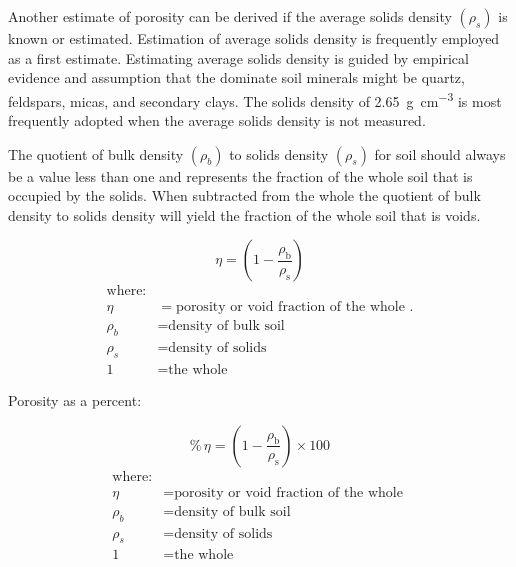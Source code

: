 \documentclass[letterpaper, 12pt]{article}
\begin{document}
Another estimate of porosity can be derived if the average solids density $\left(\rho_s\right)$ is known or estimated. Estimation of average solids density is frequently employed as a first estimate. Estimating average solids density is guided by empirical evidence and assumption that the dominate soil minerals might be quartz, feldspars, micas, and secondary clays. The solids density of \qty[per-mode = symbol]{2.65}{\gram\per\cubic\centi\metre} is most frequently adopted when the average solids density is not measured.

The quotient of bulk density $\left(\rho_b\right)$ to solids density $\left(\rho_s\right)$ for soil should always be a value less than one and represents the fraction of the whole soil that is occupied by the solids. When subtracted from the whole the quotient of bulk density to solids density will yield the fraction of the whole soil that is voids.

\noindent\begin{minipage}{\textwidth}
\begin{equation}
    \eta =\left(1-\frac{\rho_{\text{b}}}{\rho_{\text{s}}}\right)
\end{equation}
\begin{equation*}
    \begin{aligned}
        \text{where:}                                            \\
        \eta &= \text{porosity or void fraction of the whole }.  \\
        \rho_b &= \text{density of bulk soil}                    \\
        \rho_s &= \text{density of solids}                       \\
        1 &= \text{the whole}
    \end{aligned}
\end{equation*}
\end{minipage}

Porosity as a percent:

\noindent\begin{minipage}{\textwidth}
\begin{equation}
    \%\,\eta =\left(1-\frac{\rho_{\text{b}}}{\rho_{\text{s}}}\right) \times 100
\end{equation}
\begin{equation*}
    \begin{aligned}
        \text{where:}                                          \\
        \eta &= \text{porosity or void fraction of the whole } \\
        \rho_b &= \text{density of bulk soil}                  \\
        \rho_s &= \text{density of solids}                     \\
        1 &= \text{the whole}
    \end{aligned}
\end{equation*}
\end{minipage}
\end{document}
